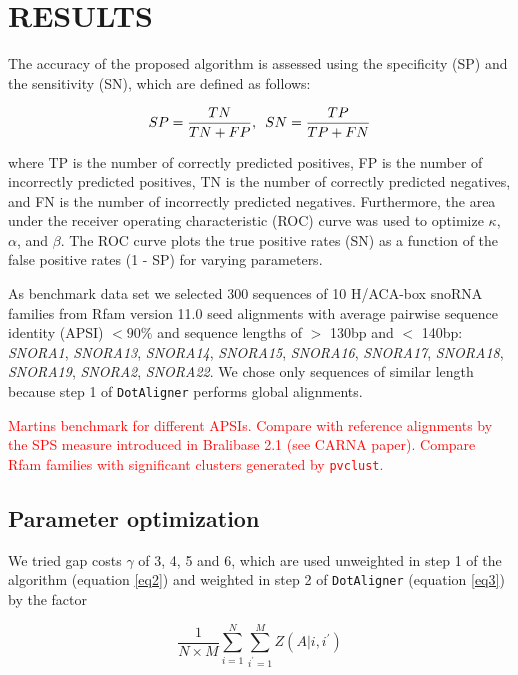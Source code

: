 \documentclass[a4paper,twoside]{article}
\newcommand\dotaligner{\texttt{DotAligner}}
\newcommand\pvclust{\texttt{pvclust}}
\newcommand{\RED}[1]{\textcolor{red}{#1}}
\begin{document}
\section{\uppercase{Results}}

\noindent The accuracy of the proposed algorithm is assessed using the
specificity (SP) and the sensitivity (SN), which are defined as follows:

\begin{equation}\label{eq5}
	SP = \frac{TN}{TN + FP}, \hspace{5px} SN = \frac{TP}{TP + FN}
\end{equation}

where TP is the number of correctly predicted positives, FP is the number of
incorrectly predicted positives, TN is the number of correctly predicted
negatives, and FN is the number of incorrectly predicted negatives.
Furthermore, the area under the receiver operating characteristic (ROC) curve
was used to optimize $\kappa$, $\alpha$, and $\beta$. The ROC curve
plots the true positive rates (SN) as a function of the false positive rates (1
- SP) for varying parameters.

As benchmark data set we selected 300 sequences of 10 H/ACA-box snoRNA families
from Rfam version 11.0 seed alignments with average pairwise sequence identity
(APSI) $< 90\%$ and sequence lengths of $>$ 130bp and $<$ 140bp: \emph{SNORA1},
\emph{SNORA13}, \emph{SNORA14}, \emph{SNORA15}, \emph{SNORA16}, \emph{SNORA17},
\emph{SNORA18}, \emph{SNORA19}, \emph{SNORA2}, \emph{SNORA22}. We chose only
sequences of similar length because step 1 of \dotaligner{} performs global
alignments.

\RED{Martins benchmark for different APSIs. Compare with reference alignments by
the SPS measure introduced in Bralibase 2.1 (see CARNA paper). Compare Rfam
families with significant clusters generated by \pvclust.}


\subsection{Parameter optimization}

\noindent We tried gap costs $\gamma$ of 3, 4, 5 and 6, which are used
unweighted in step 1 of the algorithm (equation \ref{eq2}) and weighted in step
2 of \dotaligner{} (equation \ref{eq3}) by the factor 

\begin{equation}\label{eq6}
	\frac{1}{N \times M} \sum_{i=1}^{N} \sum_{i^\prime=1}^{M} Z(A|i,i^\prime)
\end{equation}
\end{document}

